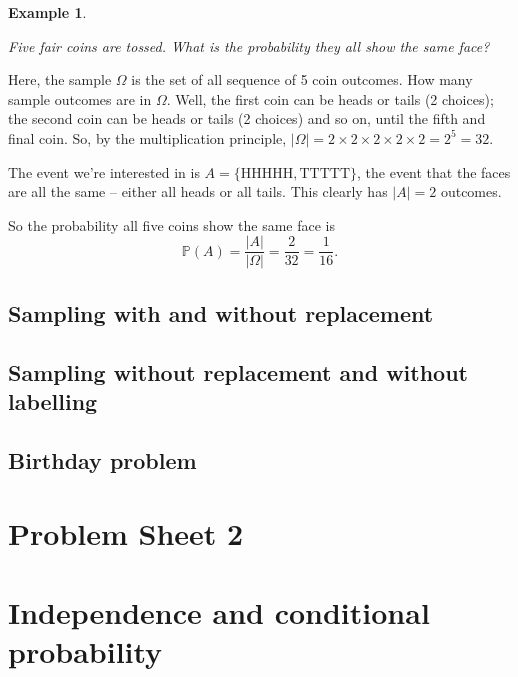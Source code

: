 \documentclass[
  a4paper,
]{book}
\theoremstyle{definition}
\theoremstyle{definition}
\newtheorem{example}{Example}[chapter]
\theoremstyle{definition}
\theoremstyle{remark}
\begin{document}
\begin{example}
\protect\hypertarget{exm:unlabeled-div-20}{}\label{exm:unlabeled-div-20}

\emph{Five fair coins are tossed. What is the probability they all show the same face?}

Here, the sample \(\Omega\) is the set of all sequence of 5 coin outcomes. How many sample outcomes are in \(\Omega\). Well, the first coin can be heads or tails (2 choices); the second coin can be heads or tails (2 choices) and so on, until the fifth and final coin. So, by the multiplication principle, \(|\Omega| = 2 \times 2 \times 2 \times 2 \times 2 = 2^5 = 32\).

The event we're interested in is \(A = \{\text{HHHHH}, \text{TTTTT}\}\), the event that the faces are all the same -- either all heads or all tails. This clearly has \(|A| = 2\) outcomes.

So the probability all five coins show the same face is
\[ \mathbb P(A) = \frac{|A|}{|\Omega|} = \frac{2}{32} = \frac{1}{16} . \]

\end{example}

\hypertarget{sampling}{%
\section{Sampling with and without replacement}\label{sampling}}

\hypertarget{combinations}{%
\section{Sampling without replacement and without labelling}\label{combinations}}

\hypertarget{birthday}{%
\section{Birthday problem}\label{birthday}}

\hypertarget{P2}{%
\chapter*{Problem Sheet 2}\label{P2}}

\hypertarget{S04-independence}{%
\chapter{Independence and conditional probability}\label{S04-independence}}
\end{document}
